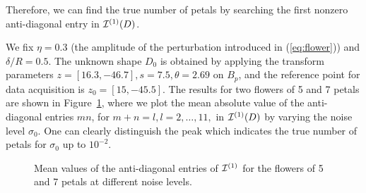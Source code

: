 Therefore, we can find the true number of petals by searching the
first nonzero anti-diagonal entry in $\mathcal{I}^{(1)}(D)$.

We fix $\eta=0.3$ (the amplitude of the perturbation introduced in
(\ref{eq:flower})) and $\delta/R=0.5$. The unknown shape $D_0$ is
obtained by applying the transform parameters $z=[16.3, -46.7],
s=7.5, \theta=2.69$ on $B_p$, and the reference point for data
acquisition is $z_0=[15, -45.5]$. The results for two flowers of 5
and 7 petals are shown in Figure~\ref{fig:matching_flower}, where
we plot the mean absolute value of the anti-diagonal entries $mn$,
for $m+n =l, l=2, \ldots, 11,$ in $\mathcal{I}^{(1)}(D)$ by varying the noise
level $\sigma_0$. One can clearly distinguish the peak which
indicates the true number of petals for $\sigma_0$ up to
$10^{-2}$.

\begin{figure}[htp]
  \centering
  \caption{Mean values of the anti-diagonal entries of $\mathcal{I}^{(1)}$ for the flowers of
    5 and 7 petals at different noise levels.}
  \label{fig:matching_flower}
\end{figure}

